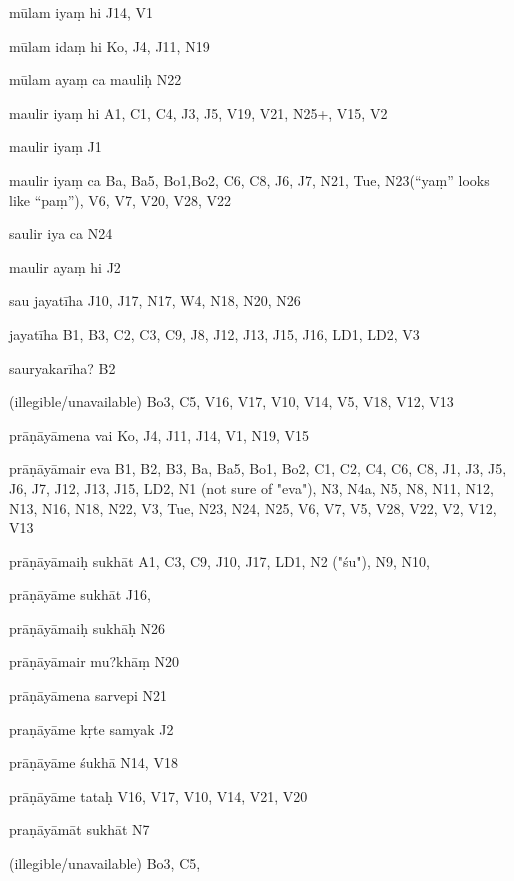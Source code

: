 \begin{ekdosis}
\begin{marma}[hp01_055]
\begin{marma}[hp02_009]
\begin{marma}[hp02_011]
\begin{marma}[hp02_35d]
\item[mūlam iyaṃ hi] J14, V1
\item[mūlam idaṃ hi] Ko, J4, J11, N19
\item[mūlam ayaṃ ca mauliḥ] N22
\item[maulir iyaṃ hi] A1, C1, C4, J3, J5, V19, V21, N25+, V15, V2
\item[maulir iyaṃ] J1
\item[maulir iyaṃ ca] Ba, Ba5, Bo1,Bo2, C6, C8, J6, J7, N21, Tue, N23(“yaṃ” looks like “paṃ”), V6, V7, V20, V28, V22
\item[saulir iya ca] N24
\item[maulir ayaṃ hi] J2
\item[sau jayatīha] J10, J17, N17, W4, N18, N20, N26
\item[jayatīha] B1, B3, C2, C3, C9, J8, J12, J13, J15, J16, LD1, LD2, V3
\item[sauryakarīha?] B2
\item[(illegible/unavailable)] Bo3, C5, V16, V17, V10, V14, V5, V18, V12, V13
 \begin{description}

        \end{description}
\end{marma}

\begin{marma}[hp02_38a]
\item[prāṇāyāmena vai] Ko, J4, J11, J14, V1, N19, V15
\item[prāṇāyāmair eva] B1, B2, B3, Ba, Ba5, Bo1, Bo2, C1, C2, C4, C6, C8, J1, J3, J5, J6, J7, J12, J13, J15, LD2, N1 (not sure of "eva"), N3, N4a, N5, N8, N11, N12, N13, N16, N18, N22, V3, Tue, N23, N24, N25, V6, V7, V5, V28, V22, V2, V12, V13
\item[prāṇāyāmaiḥ sukhāt] A1, C3, C9, J10, J17, LD1, N2 ("śu"), N9, N10,
\item[prāṇāyāme sukhāt] J16,
\item[prāṇāyāmaiḥ sukhāḥ] N26
\item[prāṇāyāmair mu?khāṃ] N20
\item[prāṇāyāmena sarvepi] N21
\item[praṇāyāme kṛte samyak] J2
\item[prāṇāyāme śukhā] N14, V18
\item[prāṇāyāme tataḥ] V16, V17, V10, V14, V21, V20
\item[praṇāyāmāt sukhāt] N7
\item[(illegible/unavailable)] Bo3, C5,
 \begin{description}


\end{description}
\end{marma}
\end{marma}
\end{marma}
\end{marma}
\end{ekdosis}

